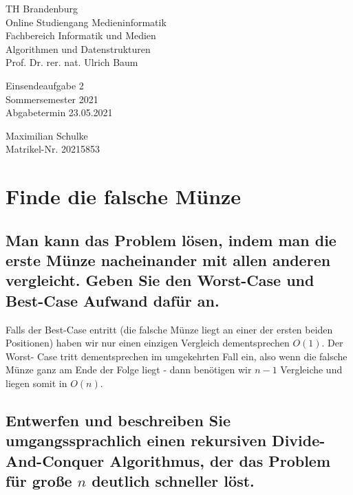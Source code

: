 \documentclass{article}
\begin{document}
\begin{titlepage}
	\begin{flushleft}
		TH Brandenburg \\
		Online Studiengang Medieninformatik \\
		Fachbereich Informatik und Medien \\
		Algorithmen und Datenstrukturen \\
		Prof. Dr. rer. nat. Ulrich Baum
	\end{flushleft}

	\vfill

	\begin{center}
		\Large{Einsendeaufgabe 2}\\[0.5em]
		\large{Sommersemester 2021}\\[0.25em]
		\large{Abgabetermin 23.05.2021}
	\end{center}

	\vfill

	\begin{flushright}
		Maximilian Schulke \\
		Matrikel-Nr. 20215853
	\end{flushright}
\end{titlepage}

\newpage

\section{Finde die falsche Münze}

\subsection{Man kann das Problem lösen, indem man die erste Münze nacheinander mit
allen anderen vergleicht. Geben Sie den Worst-Case und Best-Case Aufwand dafür an.}

Falls der Best-Case entritt (die falsche Münze liegt an einer der ersten beiden
Positionen) haben wir nur einen einzigen Vergleich dementsprechen $O(1)$. Der Worst-
Case tritt dementsprechen im umgekehrten Fall ein, also wenn die falsche Münze ganz
am Ende der Folge liegt - dann benötigen wir $n - 1$ Vergleiche und liegen somit in
$O(n)$.

\subsection{Entwerfen und beschreiben Sie umgangssprachlich einen rekursiven Divide-And-Conquer
Algorithmus, der das Problem für große $n$ deutlich schneller löst.}
\end{document}
